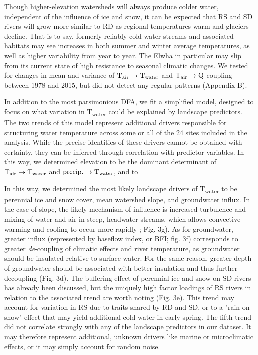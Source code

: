 \documentclass[notitlepage]{article}
\begin{document}
Though higher-elevation watersheds will always produce colder water, independent of the influence of ice and snow, it can be expected that RS and SD rivers will grow more similar to RD as regional temperatures warm and glaciers decline. That is to say, formerly reliably cold-water streams and associated habitats may see increases in both summer and winter average temperatures, as well as higher variability from year to year. The Elwha in particular may slip from its current state of high resistance to seasonal climatic changes. We tested for changes in mean and variance of $\textrm{T}\textsubscript{air}\rightarrow \textrm{T}\textsubscript{water}$ and $\textrm{T}\textsubscript{air}\rightarrow \textrm{Q}$ coupling between 1978 and 2015, but did not detect any regular patterns (Appendix B).

In addition to the most parsimonious DFA, we fit a simplified model, designed to focus on what variation in T\textsubscript{water} could be explained by landscape predictors. The two trends of this model represent additional drivers responsible for structuring water temperature across some or all of the 24 sites included in the analysis. While the precise identities of these drivers cannot be obtained with certainty, they can be inferred through correlation with predictor variables. In this way, we determined elevation to be the dominant determinant of $\textrm{T}\textsubscript{air}\rightarrow \textrm{T}\textsubscript{water}$ and $\textrm{precip.}\rightarrow \textrm{T}\textsubscript{water}$, and to %

In this way, we determined the most likely landscape drivers of T\textsubscript{water} to be perennial ice and snow cover, mean watershed slope, and groundwater influx. In the case of slope, the likely mechanism of influence is increased turbulence and mixing of water and air in steep, headwater streams, which allows convective warming and cooling to occur more rapidly \citealt{brutsaert1975theory}; Fig. 3g). As for groundwater, greater influx (represented by baseflow index, or BFI; fig. 3f) corresponds to greater {\it de}-coupling of climatic effects and river temperature, as groundwater should be insulated relative to surface water. For the same reason, greater depth of groundwater should be associated with better insulation and thus further decoupling (Fig. 3d). The buffering effect of perennial ice and snow on SD rivers has already been discussed, but the uniquely high factor loadings of RS rivers in relation to the associated trend are worth noting (Fig. 3e). This trend may account for variation in RS due to traits shared by RD and SD, or to a "rain-on-snow" effect that may yield additional cold water in early spring. The fifth trend did not correlate strongly with any of the landscape predictors in our dataset. It may therefore represent additional, unknown drivers like marine or microclimatic effects, or it may simply account for random noise.
\end{document}
